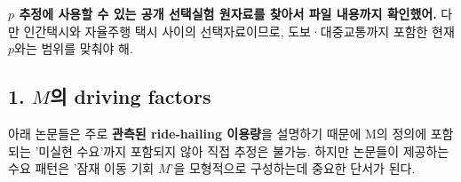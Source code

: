 \documentclass[11pt,a4paper]{article}
\begin{document}
\textbf{\(p\) 추정에 사용할 수 있는 공개 선택실험 원자료를
찾아서 파일 내용까지 확인했어.} 다만 인간택시와 자율주행 택시 사이의
선택자료이므로, 도보·대중교통까지 포함한 현재 \(p\)와는 범위를 맞춰야
해.
\hypertarget{muxc758-driving-factors-uxadfcuxac70-uxb17cuxbb38-uxcd94uxac00}{%
\subsection{\texorpdfstring{1. \(M\)의 driving factors}{1. M의 driving factors}}\label{muxc758-driving-factors-uxadfcuxac70-uxb17cuxbb38-uxcd94uxac00}}

아래 논문들은 주로 \textbf{관측된 ride-hailing 이용량}을 설명하기 때문에 M의 정의에 포함되는 '미실현 수요'까지 포함되지 않아 직접 추정은 불가능. 하지만 논문들이 제공하는 수요 패턴은 '잠재 이동 기회 \(M\)'을 모형적으로 구성하는데 중요한 단서가 된다.
\end{document}
